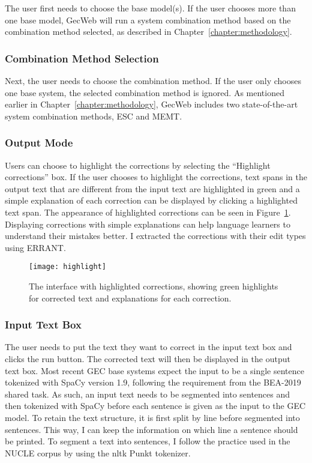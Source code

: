The user first needs to choose the base model(s).
If the user chooses more than one base model, GecWeb will run a system combination method based on the combination method selected, as described in Chapter~\ref{chapter:methodology}.

\subsubsection{Combination Method Selection}

Next, the user needs to choose the combination method.
If the user only chooses one base system, the selected combination method is ignored.
As mentioned earlier in Chapter~\ref{chapter:methodology}, GecWeb includes two state-of-the-art system combination methods, ESC and MEMT.

\subsubsection{Output Mode}

Users can choose to highlight the corrections by selecting the ``Highlight corrections'' box.
If the user chooses to highlight the corrections, text spans in the output text that are different from the input text are highlighted in green and a simple explanation of each correction can be displayed by clicking a highlighted text span.
The appearance of highlighted corrections can be seen in Figure~\ref{fig:highlight}.
Displaying corrections with simple explanations can help language learners to understand their mistakes better.
I extracted the corrections with their edit types using ERRANT.

\begin{figure}[htbp]
  \begin{center}
    \texttt{[image: highlight]}
  \end{center}
  \caption{The interface with highlighted corrections, showing green highlights for corrected text and explanations for each correction.}\label{fig:highlight} \end{figure}

\subsubsection{Input Text Box}

The user needs to put the text they want to correct in the input text box and clicks the run button.
The corrected text will then be displayed in the output text box.
Most recent GEC base systems expect the input to be a single sentence tokenized with SpaCy version 1.9, following the requirement from the BEA-2019 shared task.
As such, an input text needs to be segmented into sentences and then tokenized with SpaCy before each sentence is given as the input to the GEC model.
To retain the text structure, it is first split by line before segmented into sentences.
This way, I can keep the information on which line a sentence should be printed.
To segment a text into sentences, I follow the practice used in the NUCLE corpus by using the nltk Punkt
tokenizer.

